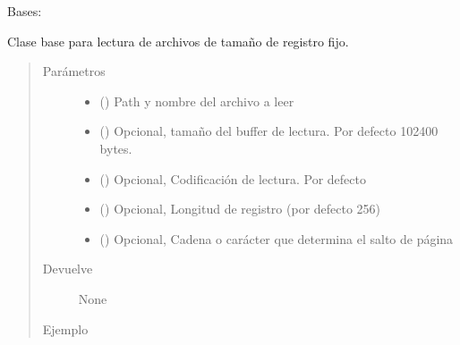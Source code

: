 \documentclass[a4paper,12pt,spanish]{sphinxmanual}
\begin{document}
\begin{fulllineitems}
\label{\detokenize{openerm.SpoolFixedRecordLength:openerm.SpoolFixedRecordLength.SpoolFixedRecordLength}}
Bases: 

Clase base para lectura de archivos de tamaño de registro fijo.
\begin{quote}\begin{description}
\item[{Parámetros}] \leavevmode\begin{itemize}
\item {} 
 () \textendash{} Path y nombre del archivo a leer

\item {} 
 () \textendash{} Opcional, tamaño del buffer de lectura.
Por defecto 102400 bytes.

\item {} 
 () \textendash{} Opcional, Codificación de lectura. Por defecto 

\item {} 
 () \textendash{} Opcional, Longitud de registro (por defecto 256)

\item {} 
 () \textendash{} Opcional, Cadena o carácter que determina el salto de página

\end{itemize}

\item[{Devuelve}] \leavevmode
None

\item[{Ejemplo}] \leavevmode
\begin{sphinxVerbatim}[commandchars=\\\{\}]
   
    
               
                    
\end{sphinxVerbatim}


\end{description}
\end{quote}
\end{fulllineitems}
\end{document}
